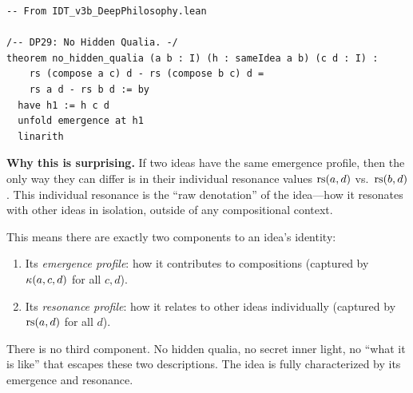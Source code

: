\begin{lstlisting}
-- From IDT_v3b_DeepPhilosophy.lean

/-- DP29: No Hidden Qualia. -/
theorem no_hidden_qualia (a b : I) (h : sameIdea a b) (c d : I) :
    rs (compose a c) d - rs (compose b c) d =
    rs a d - rs b d := by
  have h1 := h c d
  unfold emergence at h1
  linarith
\end{lstlisting}

\begin{surprisebox}
\noindent\textbf{Why this is surprising.}
If two ideas have the same emergence profile, then the only way they
can differ is in their individual resonance values $\mathrm{rs}(a,d)$ vs.\
$\mathrm{rs}(b,d)$.  This individual resonance is the ``raw denotation'' of
the idea---how it resonates with other ideas in isolation, outside
of any compositional context.

This means there are exactly two components to an idea's identity:
\begin{enumerate}
\item Its \emph{emergence profile}: how it contributes to compositions
      (captured by $\kappa(a, c, d)$ for all $c, d$).
\item Its \emph{resonance profile}: how it relates to other ideas
      individually (captured by $\mathrm{rs}(a, d)$ for all $d$).
\end{enumerate}
There is no third component.  No hidden qualia, no secret inner
light, no ``what it is like'' that escapes these two descriptions.
The idea is fully characterized by its emergence and resonance.
\end{surprisebox}

